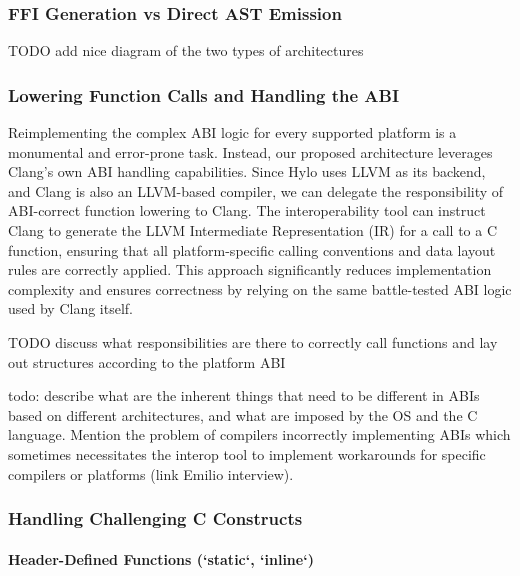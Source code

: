 \subsubsection{FFI Generation vs Direct AST Emission}

TODO add nice diagram of the two types of architectures

\subsubsection{Lowering Function Calls and Handling the ABI}

Reimplementing the complex ABI logic for every supported platform is a monumental and error-prone task. Instead, our proposed architecture leverages Clang's own ABI handling capabilities. Since Hylo uses LLVM as its backend, and Clang is also an LLVM-based compiler, we can delegate the responsibility of ABI-correct function lowering to Clang. The interoperability tool can instruct Clang to generate the LLVM Intermediate Representation (IR) for a call to a C function, ensuring that all platform-specific calling conventions and data layout rules are correctly applied. This approach significantly reduces implementation complexity and ensures correctness by relying on the same battle-tested ABI logic used by Clang itself.

TODO discuss what responsibilities are there to correctly call functions and lay out structures according to the platform ABI

todo: describe what are the inherent things that need to be different in ABIs based on different architectures, and what are imposed by the OS and the C language. Mention the problem of compilers incorrectly implementing ABIs which sometimes necessitates the interop tool to implement workarounds for specific compilers or platforms (link Emilio interview).

\subsubsection{Handling Challenging C Constructs}

\paragraph{Header-Defined Functions (`static`, `inline`)}

